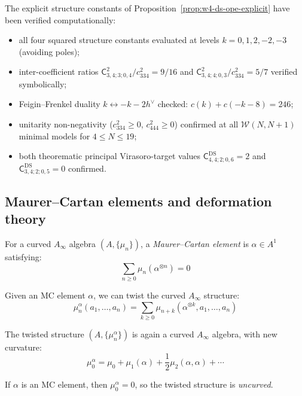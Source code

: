 \begin{computation}
\label{comp:w4-ds-ope-extraction}
The explicit structure constants of
Proposition~\ref{prop:w4-ds-ope-explicit} have been verified
computationally:
\begin{itemize}
\item all four squared structure constants evaluated at levels
  $k = 0, 1, 2, -2, -3$ (avoiding poles);
\item inter-coefficient ratios
  $\mathsf{C}_{3,4;3;0,4}^2/c_{334}^2 = 9/16$ and
  $\mathsf{C}_{3,4;4;0,3}^2/c_{334}^2 = 5/7$ verified symbolically;
\item Feigin--Frenkel duality $k \leftrightarrow -k-2h^\vee$
  checked: $c(k) + c(-k-8) = 246$;
\item unitarity non-negativity ($c_{334}^2 \geq 0$, $c_{444}^2 \geq 0$)
  confirmed at all $\mathcal{W}(N, N{+}1)$ minimal models
  for $4 \leq N \leq 19$;
\item both theorematic principal Virasoro-target values
  $\mathsf{C}^{\mathrm{DS}}_{4,4;2;0,6} = 2$ and
  $\mathsf{C}^{\mathrm{DS}}_{3,4;2;0,5} = 0$ confirmed.
\end{itemize}
\end{computation}

\subsection{Maurer--Cartan elements and deformation theory}
\label{sec:maurer-cartan-curved}

\begin{definition}
\label{def:mc-element-curved}
For a curved $A_\infty$ algebra $(A, \{\mu_n\})$, a \emph{Maurer--Cartan element} is $\alpha 
\in A^1$ satisfying:
\begin{equation}
\sum_{n \geq 0} \mu_n(\alpha^{\otimes n}) = 0
\end{equation}
\end{definition}

\begin{theorem}
\label{thm:twisting-mc}
Given an MC element $\alpha$, we can twist the curved $A_\infty$ structure:
\begin{equation}
\mu_n^\alpha(a_1, \ldots, a_n) = \sum_{k \geq 0} \mu_{n+k}(\alpha^{\otimes k}, 
a_1, \ldots, a_n)
\end{equation}

The twisted structure $(A, \{\mu_n^\alpha\})$ is again a curved $A_\infty$ algebra, with new 
curvature:
\begin{equation}
\mu_0^\alpha = \mu_0 + \mu_1(\alpha) + \frac{1}{2}\mu_2(\alpha, \alpha) + \cdots
\end{equation}

If $\alpha$ is an MC element, then $\mu_0^\alpha = 0$, so the twisted structure is 
\emph{uncurved}.
\end{theorem}

